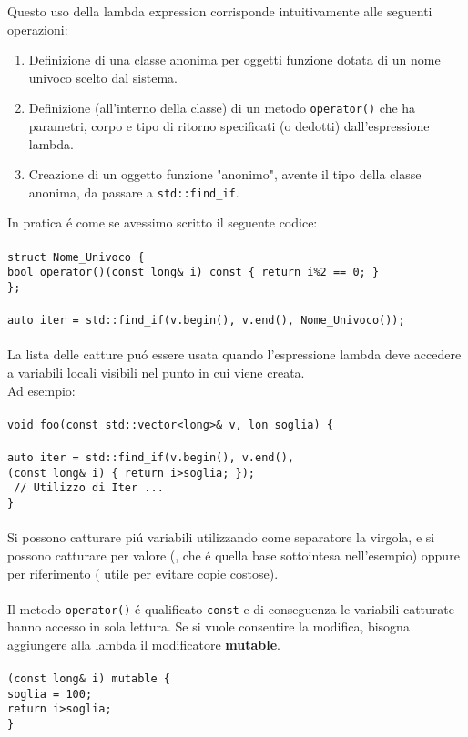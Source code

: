\documentclass{article}
\newcommand\tab[1][1cm]{\hspace*{#1}}
\begin{document}
Questo uso della lambda expression corrisponde intuitivamente alle seguenti operazioni:\\
\begin{enumerate}
\item Definizione di una classe anonima per oggetti funzione dotata di un nome univoco scelto dal sistema.
\item Definizione (all'interno della classe) di un metodo \texttt{operator()} che ha parametri, corpo e tipo di ritorno specificati (o dedotti) dall'espressione lambda.
\item Creazione di un oggetto funzione "anonimo", avente il tipo della classe anonima, da passare a \texttt{std::find\_if}.\\
\end{enumerate}
In pratica \'e come se avessimo scritto il seguente codice:\\ \\
\texttt{struct Nome\_Univoco \{ \\ \tab bool operator()(const long\& i) const \{ return i\%2 == 0; \} \\ \};\\ \\auto iter = std::find\_if(v.begin(), v.end(), Nome\_Univoco());} \\ \\ La lista delle catture pu\'o essere usata quando l'espressione lambda deve accedere a variabili locali visibili nel punto in cui viene creata.\\Ad esempio: \\ \\ \texttt{void foo(const std::vector<long>\& v, lon soglia) \{ \\ \\ \tab auto iter = std::find\_if(v.begin(), v.end(),\\ \tab \detokenize{[soglia]}(const long\& i) \{ return i>soglia; \}); \\ \tab \textcolor{grigio}{ // Utilizzo di Iter ...\\ }\}} \\ \\ Si possono catturare pi\'u variabili utilizzando come separatore la virgola, e si possono catturare per valore (\texttt{\detokenize{[=soglia]}}, che \'e quella base sottointesa nell'esempio) oppure per riferimento (\texttt{\detokenize{[&soglia]}} utile per evitare copie costose).\\ 
\\Il metodo \texttt{operator()} \'e qualificato \texttt{const} e di conseguenza le variabili catturate hanno accesso in sola lettura. Se si vuole consentire la modifica, bisogna aggiungere alla lambda il modificatore \textbf{mutable}. \\ \\ \texttt{\detokenize{[soglia]}(const long\& i) mutable \{\\ \tab soglia = 100; \\ \tab return i>soglia; \\ \}}
\end{document}
